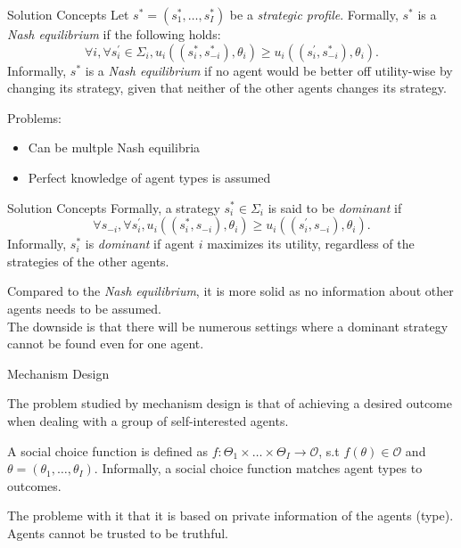 \documentclass{beamer}
\begin{document}
\begin{frame}{Solution Concepts}
    \pause
    Let $s^*=(s_1^*,\dots,s_I^*)$ be a \emph{strategic profile}. Formally,
    $s^*$ is a \emph{Nash equilibrium} if the following holds:
    $$\forall i, \forall s_i^{'} \in \Sigma_i, u_i((s_i^*, s_{-i}^*), \theta_i)
    \geq u_i((s_i^{'},s_{-i}^*), \theta_i).$$\pause
    Informally, $s^*$ is a \emph{Nash equilibrium} if no agent 
    would be better off utility-wise by changing its strategy, 
    given that neither of the other agents changes its strategy.\pause

    \vspace{5mm}
    Problems: \pause
    \begin{itemize}
        \item Can be multple Nash equilibria\pause
        \item Perfect knowledge of agent types is assumed
    \end{itemize}
\end{frame}

\begin{frame}{Solution Concepts}
    \pause
    Formally, a strategy $s_i^* \in \Sigma_i$ is said to be \emph{dominant} if
    $$\forall s_{-i}, \forall s_i^{'}, u_i((s_i^*, s_{-i}),\theta_i)
    \ge u_i((s_i^{'}, s_{-i}),\theta_i).$$\pause
    Informally, $s_i^*$ is \emph{dominant} if agent $i$ maximizes
    its utility, regardless of the strategies of the other agents.\pause

    \vspace{5mm}

    Compared to the \emph{Nash equilibrium}, it is more solid as no information
    about other agents needs to be assumed.\\
    \vspace{3mm}\pause
    The downside is that there will
    be numerous settings where a dominant strategy cannot be found even for
    one agent.
\end{frame}

\begin{frame}{Mechanism Design}
    \pause

    The problem studied by mechanism design is that of achieving a desired
    outcome when dealing with a group of self-interested agents.\pause
    \vspace{5mm}

    A social choice function is defined as $f:\Theta_1 \times \dots \times \Theta_I \rightarrow \mathcal{O}$, s.t $f(\theta) \in \mathcal{O}$ and $\theta=(\theta_1,\dots,\theta_I)$.
    Informally, a social choice function matches agent types to outcomes.\pause

    \vspace{5mm}

    The probleme with it that it is based on private information of the agents
    (type). Agents cannot be trusted to be truthful.
\end{frame}
\end{document}
